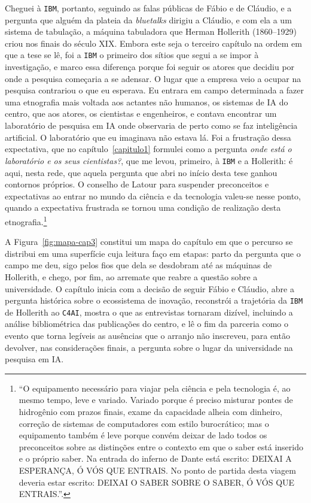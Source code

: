 Cheguei à \texttt{IBM}, portanto, seguindo as falas públicas de Fábio e de Cláudio, e a pergunta que alguém da plateia da \textit{bluetalks} dirigiu a Cláudio, e com ela a um sistema de tabulação, a máquina tabuladora que Herman Hollerith (1860--1929) criou nos finais do século XIX. Embora este seja o terceiro capítulo na ordem em que a tese se lê, foi a \texttt{IBM} o primeiro dos sítios que segui a se impor à investigação, e marco essa diferença porque foi seguir os atores que decidiu por onde a pesquisa começaria a se adensar. O lugar que a empresa veio a ocupar na pesquisa contrariou o que eu esperava. Eu entrara em campo determinada a fazer uma etnografia mais voltada aos actantes não humanos, os sistemas de IA do centro, que aos atores, os cientistas e engenheiros, e contava encontrar um laboratório de pesquisa em IA onde observaria de perto como se faz inteligência artificial. O laboratório que eu imaginava não estava lá. Foi a frustração dessa expectativa, que no capítulo~\ref{capitulo1} formulei como a pergunta \emph{onde está o laboratório e os seus cientistas?}, que me levou, primeiro, à \texttt{IBM} e a Hollerith: é aqui, nesta rede, que aquela pergunta que abri no início desta tese ganhou contornos próprios. O conselho de Latour para suspender preconceitos e expectativas ao entrar no mundo da ciência e da tecnologia valeu-se nesse ponto, quando a expectativa frustrada se tornou uma condição de realização desta etnografia.\footnote{\enquote{O equipamento necessário para viajar pela ciência e pela tecnologia é, ao mesmo tempo, leve e variado. Variado porque é preciso misturar pontes de hidrogênio com prazos finais, exame da capacidade alheia com dinheiro, correção de sistemas de computadores com estilo burocrático; mas o equipamento também é leve porque convém deixar de lado todos os preconceitos sobre as distinções entre o contexto em que o saber está inserido e o próprio saber. Na entrada do inferno de Dante está escrito: DEIXAI A ESPERANÇA, Ó VÓS QUE ENTRAIS. No ponto de partida desta viagem deveria estar escrito: DEIXAI O SABER SOBRE O SABER, Ó VÓS QUE ENTRAIS.}\parencite[p.~10]{Latour2011CienciaEmAcao}.}

A Figura~\ref{fig:mapa-cap3} constitui um mapa do capítulo em que o percurso se distribui em uma superfície cuja leitura faço em etapas: parto da pergunta que o campo me deu, sigo pelos fios que dela se desdobram até as máquinas de Hollerith, e chego, por fim, ao arremate que reabre a questão sobre a universidade. O capítulo inicia com a decisão de seguir Fábio e Cláudio, abre a pergunta histórica sobre o ecossistema de inovação, reconstrói a trajetória da \texttt{IBM} de Hollerith ao \texttt{C4AI}, mostra o que as entrevistas tornaram dizível, incluindo a análise bibliométrica das publicações do centro, e lê o fim da parceria como o evento que torna legíveis as ausências que o arranjo não inscreveu, para então devolver, nas considerações finais, a pergunta sobre o lugar da universidade na pesquisa em IA.

